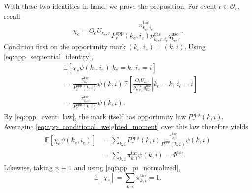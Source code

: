 With these two identities in hand, we prove the proposition.
For event $e\in\mathcal{O}_r$, recall
\begin{equation}
 \chi_e
 =
 O_eU_{k_e,r}
 \frac{
 \pi^{\mathrm{tar}}_{k_e,i_e}
 }{
 P_r^{\mathrm{opp}}(k_e,i_e)
 p^{\mathrm{obs}}_{k_e,r,i_e}
 q^{\mathrm{use}}_{k_e,r}
 }.
 \label{eq:app_chi}
\end{equation}
Condition first on the opportunity mark $(k_e,i_e)=(k,i)$.  Using
\eqref{eq:app_sequential_identity},
\begin{align}
 &\mathbb{E}
 \left[
 \left.
 \chi_e\psi(k_e,i_e)
 \right|
 k_e=k,\,
 i_e=i
 \right]
 \nonumber\\
 &=
 \frac{
 \pi^{\mathrm{tar}}_{k,i}
 }{
 P_r^{\mathrm{opp}}(k,i)
 }
 \psi(k,i)
 \,
 \mathbb{E}
 \left[
 \left.
 \frac{
 O_eU_{k,r}
 }{
 p^{\mathrm{obs}}_{k,r,i}
 q^{\mathrm{use}}_{k,r}
 }
 \right|
 k_e=k,\,
 i_e=i
 \right]
 \nonumber\\
 &=
 \frac{
 \pi^{\mathrm{tar}}_{k,i}
 }{
 P_r^{\mathrm{opp}}(k,i)
 }
 \psi(k,i).
 \label{eq:app_conditional_weighted_moment}
\end{align}
By \eqref{eq:opp_event_law}, the mark itself has opportunity law
$P_r^{\mathrm{opp}}(k,i)$.  Averaging
\eqref{eq:app_conditional_weighted_moment} over this law therefore yields
\begin{align}
 \mathbb{E}
 \left[
 \chi_e\psi(k_e,i_e)
 \right]
 &=
 \sum_{k,i}
 P_r^{\mathrm{opp}}(k,i)
 \frac{
 \pi^{\mathrm{tar}}_{k,i}
 }{
 P_r^{\mathrm{opp}}(k,i)
 }
 \psi(k,i)
 \nonumber\\
 &=
 \sum_{k,i}
 \pi^{\mathrm{tar}}_{k,i}\psi(k,i)
 =
 \Phi^{\mathrm{tar}}.
 \label{eq:app_expected_numerator_event}
\end{align}
Likewise, taking $\psi\equiv1$ and using
\eqref{eq:app_pi_normalized},
\begin{equation}
    \mathbb{E}[\chi_e]
    =
    \sum_{k,i}\pi^{\mathrm{tar}}_{k,i}
    =1.
    \label{eq:app_expected_denominator_event}
\end{equation}

